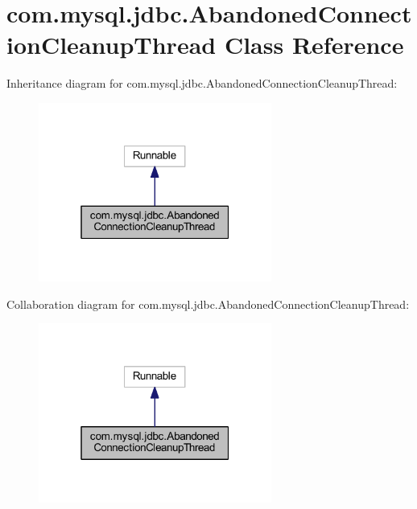 \hypertarget{classcom_1_1mysql_1_1jdbc_1_1_abandoned_connection_cleanup_thread}{}\section{com.\+mysql.\+jdbc.\+Abandoned\+Connection\+Cleanup\+Thread Class Reference}
\label{classcom_1_1mysql_1_1jdbc_1_1_abandoned_connection_cleanup_thread}


Inheritance diagram for com.\+mysql.\+jdbc.\+Abandoned\+Connection\+Cleanup\+Thread\+:\nopagebreak
\begin{figure}[H]
\begin{center}
\leavevmode
\includegraphics[width=217pt]{classcom_1_1mysql_1_1jdbc_1_1_abandoned_connection_cleanup_thread__inherit__graph}
\end{center}
\end{figure}


Collaboration diagram for com.\+mysql.\+jdbc.\+Abandoned\+Connection\+Cleanup\+Thread\+:\nopagebreak
\begin{figure}[H]
\begin{center}
\leavevmode
\includegraphics[width=217pt]{classcom_1_1mysql_1_1jdbc_1_1_abandoned_connection_cleanup_thread__coll__graph}
\end{center}
\end{figure}
